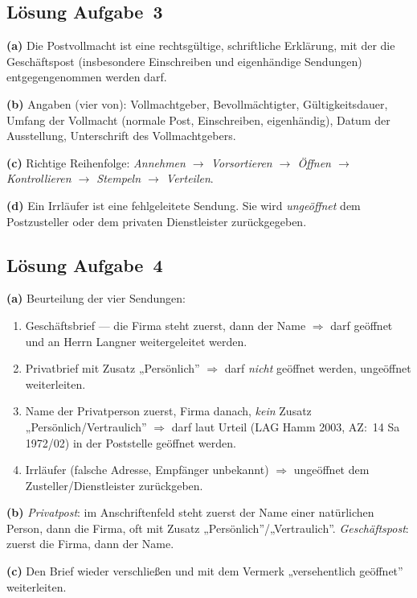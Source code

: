 \documentclass[11pt, a4paper]{article}
\begin{document}
\subsection*{Lösung Aufgabe~3}
\begin{loesung}
\textbf{(a)} Die Postvollmacht ist eine rechtsgültige, schriftliche Erklärung, mit der die
Geschäftspost (insbesondere Einschreiben und eigenhändige Sendungen) entgegengenommen werden
darf.

\textbf{(b)} Angaben (vier von): Vollmachtgeber, Bevollmächtigter, Gültigkeitsdauer, Umfang
der Vollmacht (normale Post, Einschreiben, eigenhändig), Datum der Ausstellung, Unterschrift
des Vollmachtgebers.

\textbf{(c)} Richtige Reihenfolge: \emph{Annehmen $\rightarrow$ Vorsortieren $\rightarrow$
Öffnen $\rightarrow$ Kontrollieren $\rightarrow$ Stempeln $\rightarrow$ Verteilen}.

\textbf{(d)} Ein Irrläufer ist eine fehlgeleitete Sendung. Sie wird \emph{ungeöffnet} dem
Postzusteller oder dem privaten Dienstleister zurückgegeben.
\end{loesung}

\subsection*{Lösung Aufgabe~4}
\begin{loesung}
\textbf{(a)} Beurteilung der vier Sendungen:
\begin{enumerate}[label=\arabic*., itemsep=0pt]
  \item Geschäftsbrief --- die Firma steht zuerst, dann der Name $\Rightarrow$ darf geöffnet und an Herrn Langner weitergeleitet werden.
  \item Privatbrief mit Zusatz „Persönlich” $\Rightarrow$ darf \emph{nicht} geöffnet werden, ungeöffnet weiterleiten.
  \item Name der Privatperson zuerst, Firma danach, \emph{kein} Zusatz „Persönlich/Vertraulich” $\Rightarrow$ darf laut Urteil (LAG Hamm 2003, AZ:~14 Sa 1972/02) in der Poststelle geöffnet werden.
  \item Irrläufer (falsche Adresse, Empfänger unbekannt) $\Rightarrow$ ungeöffnet dem Zusteller/Dienstleister zurückgeben.
\end{enumerate}

\textbf{(b)} \emph{Privatpost}: im Anschriftenfeld steht zuerst der Name einer natürlichen
Person, dann die Firma, oft mit Zusatz „Persönlich”/„Vertraulich”. \emph{Geschäftspost}:
zuerst die Firma, dann der Name.

\textbf{(c)} Den Brief wieder verschließen und mit dem Vermerk „versehentlich geöffnet”
weiterleiten.
\end{loesung}
\end{document}
